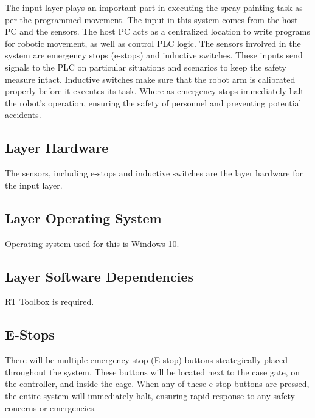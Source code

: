 The input layer plays an important part in executing the spray painting task as per the programmed movement. The input in this system comes from the host PC and the sensors. The host PC acts as a centralized location to write programs for robotic movement, as well as control PLC logic. The sensors involved in the system are emergency stops (e-stops) and inductive switches. These inputs send signals to the PLC on particular situations and scenarios to keep the safety measure intact. Inductive switches make sure that the robot arm is calibrated properly before it executes its task. Where as emergency stops immediately halt the robot's operation, ensuring the safety of personnel and preventing potential accidents.


\subsection{Layer Hardware}
The sensors, including e-stops and inductive switches are the layer hardware for the input layer. 

\subsection{Layer Operating System}
Operating system used for this is Windows 10.

\subsection{Layer Software Dependencies}
RT Toolbox is required.

\subsection{E-Stops}
There will be multiple emergency stop (E-stop) buttons strategically placed throughout the system. These buttons will be located next to the case gate, on the controller, and inside the cage. When any of these e-stop buttons are pressed, the entire system will immediately halt, ensuring rapid response to any safety concerns or emergencies.


